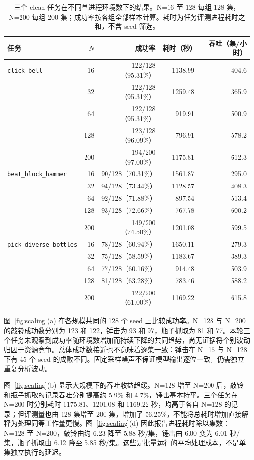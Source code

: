 \documentclass{article}
\begin{document}
\begin{table}[htbp]
\centering\small
\caption{三个 clean 任务在不同单进程环境数下的结果。N=16 至 128 每组 128 集，N=200 每组 200 集；成功率按各组全部样本计算。耗时为任务评测进程耗时之和，不含 seed 筛选。}
\label{tab:scaling}
\begin{tabular}{@{}lrrrr@{}}
\toprule
任务 & $N$ & 成功率 & 耗时（秒） & 吞吐（集/小时） \\
\midrule
\texttt{click\_bell} & 16 & 122/128（95.31\%） & 1138.99 & 404.6 \\
 & 32 & 122/128（95.31\%） & 1259.48 & 365.9 \\
 & 64 & 122/128（95.31\%） & 919.91 & 500.9 \\
 & 128 & 123/128（96.09\%） & 796.91 & 578.2 \\
 & 200 & 194/200（97.00\%） & 1175.81 & 612.3 \\
\midrule
\texttt{beat\_block\_hammer} & 16 & 90/128（70.31\%） & 1561.87 & 295.0 \\
 & 32 & 94/128（73.44\%） & 1128.57 & 408.3 \\
 & 64 & 92/128（71.88\%） & 897.54 & 513.4 \\
 & 128 & 93/128（72.66\%） & 767.78 & 600.2 \\
 & 200 & 149/200（74.50\%） & 1201.08 & 599.5 \\
\midrule
\texttt{pick\_diverse\_bottles} & 16 & 78/128（60.94\%） & 1650.11 & 279.3 \\
 & 32 & 75/128（58.59\%） & 1183.67 & 389.3 \\
 & 64 & 77/128（60.16\%） & 914.48 & 503.9 \\
 & 128 & 81/128（63.28\%） & 783.46 & 588.2 \\
 & 200 & 122/200（61.00\%） & 1169.22 & 615.8 \\
\bottomrule
\end{tabular}
\end{table}

图~\ref{fig:scaling}(a) 在各规模共同的 128 个 seed 上比较成功率。N=128 与 N=200 的敲铃成功数分别为 123 和 122，锤击为 93 和 97，瓶子抓取为 81 和 77。本轮三个任务未观察到成功率随环境数增加而持续下降的共同趋势，尚无证据将个别波动归因于资源竞争。总体成功数接近也不意味着逐集一致：锤击在 N=16 与 N=128 下有 45 个 seed 的成败不同。固定采样噪声不保证模型输出逐位一致，仍需独立重复分析波动。

图~\ref{fig:scaling}(b) 显示大规模下的吞吐收益趋缓。N=128 增至 N=200 后，敲铃和瓶子抓取的记录吞吐分别提高约 5.9\% 和 4.7\%，锤击基本持平。三个任务在 N=200 时分别耗时 1175.81、1201.08 和 1169.22 秒，均高于各自 N=128 的记录；但评测量也由 128 集增至 200 集，增加了 56.25\%，不能将总耗时增加直接解释为处理同等工作量更慢。图~\ref{fig:scaling}(d) 因此报告进程耗时除以集数：N=128 至 N=200，敲铃由约 6.23 降至 5.88 秒/集，锤击由 6.00 变为 6.01 秒/集，瓶子抓取由 6.12 降至 5.85 秒/集。这些是批量运行的平均处理成本，不是单集独立执行的延迟。
\end{document}

